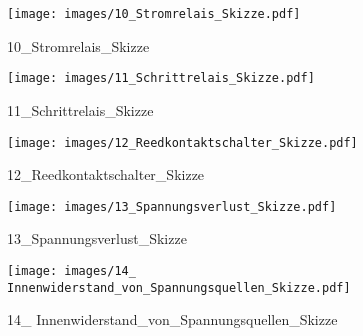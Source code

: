 %
%
\begin{figure}[!hb]%
    \centering
  \texttt{[image: images/10\_Stromrelais\_Skizze.pdf]}%
  \caption{10_Stromrelais_Skizze}%
\end{figure}

%
%
\begin{figure}[!hb]%
    \centering
  \texttt{[image: images/11\_Schrittrelais\_Skizze.pdf]}%
  \caption{11_Schrittrelais_Skizze}%
\end{figure}

%
%
\begin{figure}[!hb]%
    \centering
  \texttt{[image: images/12\_Reedkontaktschalter\_Skizze.pdf]}%
  \caption{12_Reedkontaktschalter_Skizze}%
\end{figure}

%
%
\begin{figure}[!hb]%
    \centering
  \texttt{[image: images/13\_Spannungsverlust\_Skizze.pdf]}%
  \caption{13_Spannungsverlust_Skizze}%
\end{figure}

%
%
\begin{figure}[!hb]%
    \centering
  \texttt{[image: images/14\_ Innenwiderstand\_von\_Spannungsquellen\_Skizze.pdf]}%
  \caption{14_ Innenwiderstand_von_Spannungsquellen_Skizze}%
\end{figure}

